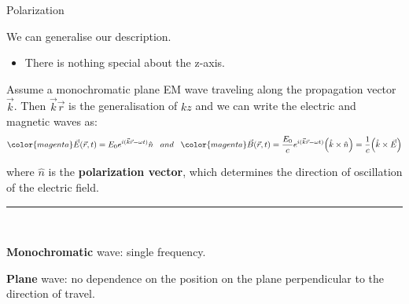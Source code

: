 \begin{frame}{Polarization}

We can generalise our description.
\begin{itemize}
     \item There is nothing special about the z-axis.
\end{itemize}

\vspace{0.2cm}

Assume a monochromatic plane EM wave traveling along the
propagation vector $\vec{k}$.
Then $\vec{k} \vec{r}$ is the generalisation of $kz$ and we can write the electric
and magnetic waves as:
\begin{equation*}
     {\color{magenta} \vec{E}(\vec{r},t) = E_0  e^{i (\vec{k} \vec{r} -\omega t)} \hat{n} }
     \;\;\; and \;\;\;
     {\color{magenta}
           \vec{B}(\vec{r},t) =
                \frac{E_0}{c}  e^{i ( \vec{k} \vec{r} -\omega t)} \Big( \hat{k} \times \hat{n} \Big) =
                \frac{1}{c}  \Big( \hat{k} \times \vec{E} \Big)
     }
\end{equation*}

where $\hat{n}$ is the {\bf polarization vector}, which determines the direction of oscillation of
the electric field.

\noindent\rule{2cm}{0.4pt}\\
{
\begin{itemize}
{\small
    \item {\bf Monochromatic} wave: single frequency.
    \item {\bf Plane} wave: no dependence on the position on the plane perpendicular to the direction of travel.
}
\end{itemize}
}

\end{frame}

%
%
%


